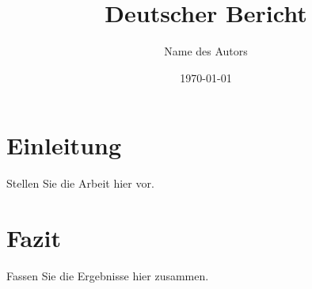 \documentclass[12pt]{report}
\title{Deutscher Bericht}
\author{Name des Autors}
\date{\today}
\begin{document}
\maketitle
\tableofcontents

\chapter{Einleitung}
Stellen Sie die Arbeit hier vor.

\chapter{Fazit}
Fassen Sie die Ergebnisse hier zusammen.

% 
\end{document}
